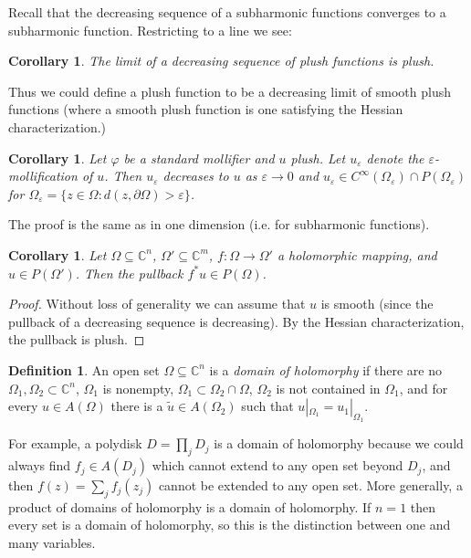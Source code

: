 \documentclass[12pt]{report}
\newcommand{\CC}{\mathbb{C}}
\newcommand{\dfn}[1]{\emph{#1}\index{#1}}
\newtheorem{corollary}[theorem]{Corollary}
\theoremstyle{definition}
\newtheorem{definition}[theorem]{Definition}
\begin{document}
Recall that the decreasing sequence of a subharmonic functions converges to a subharmonic function. Restricting to a line we see:
\begin{corollary}
    The limit of a decreasing sequence of plush functions is plush.
\end{corollary}
    Thus we could define a plush function to be a decreasing limit of smooth plush functions (where a smooth plush function is one satisfying the Hessian characterization.)

\begin{corollary}
Let $\varphi$ be a standard mollifier and $u$ plush. Let $u_\varepsilon$ denote the $\varepsilon$-mollification of $u$. Then $u_\varepsilon$ decreases to $u$ as $\varepsilon \to 0$ and $u_\varepsilon \in C^\infty(\Omega_\varepsilon) \cap P(\Omega_\varepsilon)$ for $\Omega_\varepsilon = \{z \in \Omega: d(z, \partial \Omega) > \varepsilon\}$.
\end{corollary}
The proof is the same as in one dimension (i.e. for subharmonic functions).

\begin{corollary}
    Let $\Omega \subseteq \CC^n$, $\Omega' \subseteq \CC^m$, $f: \Omega \to \Omega'$ a holomorphic mapping, and $u \in P(\Omega')$. Then the pullback $f^*u \in P(\Omega)$.
\end{corollary}
\begin{proof}
    Without loss of generality we can assume that $u$ is smooth (since the pullback of a decreasing sequence is decreasing). By the Hessian characterization, the pullback is plush.
\end{proof}


\begin{definition}
    An open set $\Omega \subseteq \CC^n$ is a \dfn{domain of holomorphy} if there are no $\Omega_1, \Omega_2 \subset \CC^n$, $\Omega_1$ is nonempty, $\Omega_1 \subset \Omega_2 \cap \Omega$, $\Omega_2$ is not contained in $\Omega_1$, and for every $u \in A(\Omega)$ there is a $\tilde u \in A(\Omega_2)$ such that $u|_{\Omega_1} = u_1|_{\Omega_1}$.
\end{definition}
    For example, a polydisk $D = \prod_j D_j$ is a domain of holomorphy because we could always find $f_j \in A(D_j)$ which cannot extend to any open set beyond $D_j$, and then $f(z) = \sum_j f_j(z_j)$ cannot be extended to any open set. More generally, a product of domains of holomorphy is a domain of holomorphy. If $n = 1$ then every set is a domain of holomorphy, so this is the distinction between one and many variables.
\end{document}
